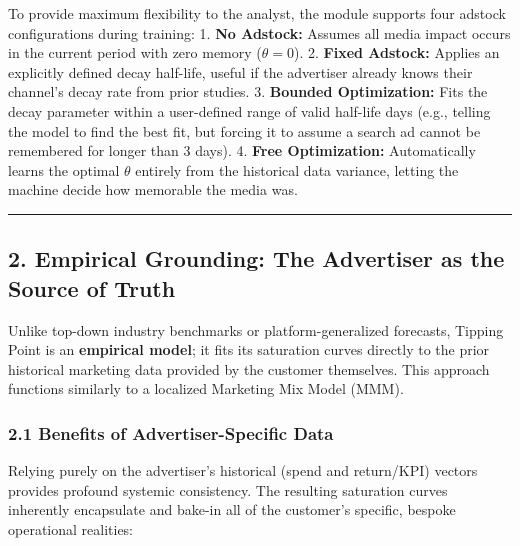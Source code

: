 \documentclass[
]{article}
\begin{document}
To provide maximum flexibility to the analyst, the module supports four
adstock configurations during training: 1. \textbf{No Adstock:} Assumes
all media impact occurs in the current period with zero memory
(\(\theta = 0\)). 2. \textbf{Fixed Adstock:} Applies an explicitly
defined decay half-life, useful if the advertiser already knows their
channel's decay rate from prior studies. 3. \textbf{Bounded
Optimization:} Fits the decay parameter within a user-defined range of
valid half-life days (e.g., telling the model to find the best fit, but
forcing it to assume a search ad cannot be remembered for longer than 3
days). 4. \textbf{Free Optimization:} Automatically learns the optimal
\(\theta\) entirely from the historical data variance, letting the
machine decide how memorable the media was.

\begin{center}\rule{0.5\linewidth}{0.5pt}\end{center}

\subsection{2. Empirical Grounding: The Advertiser as the Source of
Truth}\label{empirical-grounding-the-advertiser-as-the-source-of-truth}

Unlike top-down industry benchmarks or platform-generalized forecasts,
Tipping Point is an \textbf{empirical model}; it fits its saturation
curves directly to the prior historical marketing data provided by the
customer themselves. This approach functions similarly to a localized
Marketing Mix Model (MMM).

\subsubsection{2.1 Benefits of Advertiser-Specific
Data}\label{benefits-of-advertiser-specific-data}

Relying purely on the advertiser's historical (spend and return/KPI)
vectors provides profound systemic consistency. The resulting saturation
curves inherently encapsulate and bake-in all of the customer's
specific, bespoke operational realities:
\end{document}
